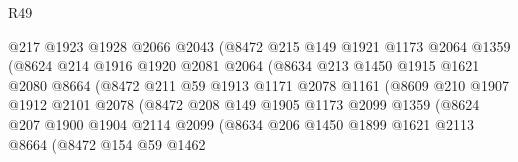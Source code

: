 \begin{lexlean}{R49}
\begin{coremodule}
                            @217
                            @1923
                            @1928
                            @2066
                            @2043
                            (@8472
                              @215
                              @149
                              @1921
                              @1173
                              @2064
                              @1359
                              (@8624
                                @214
                                @1916
                                @1920
                                @2081
                                @2064
                                (@8634
                                  @213
                                  @1450
                                  @1915
                                  @1621
                                  @2080
                                  @8664
                                  (@8472
                                    @211
                                    @59
                                    @1913
                                    @1171
                                    @2078
                                    @1161
                                    (@8609
                                      @210
                                      @1907
                                      @1912
                                      @2101
                                      @2078
                                      (@8472
                                        @208
                                        @149
                                        @1905
                                        @1173
                                        @2099
                                        @1359
                                        (@8624
                                          @207
                                          @1900
                                          @1904
                                          @2114
                                          @2099
                                          (@8634
                                            @206
                                            @1450
                                            @1899
                                            @1621
                                            @2113
                                            @8664
                                            (@8472
                                              @154
                                              @59
                                              @1462

\end{coremodule}
\end{lexlean}
